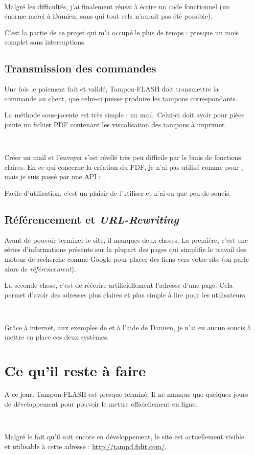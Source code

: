 ~

Malgré les difficultés, j'ai finalement réussi à écrire un code fonctionnel (un énorme merci à Damien, sans qui tout cela n'aurait pas été possible).

C'est la partie de ce projet qui m'a occupé le plus de temps : presque un mois complet sans interruptions.

\subsection{Transmission des commandes}
Une fois le paiement fait et validé, Tampon-FLASH doit transmettre la commande au client, que celui-ci puisse produire les tampons correspondants.

La méthode sous-jacente est très simple : un mail. Celui-ci doit avoir pour pièce jointe un fichier PDF contenant les visualisation des tampons à imprimer.

~

Créer un mail et l'envoyer s'est révélé très peu difficile par le biais de fonctions claires. En ce qui concerne la création du PDF, je n'ai pas utilisé \pdfcreator{} comme pour \solulog, mais je suis passé par une API : .

Facile d'utilisation, c'est un plaisir de l'utiliser et n'ai eu que peu de soucis.

\subsection{Référencement et \emph{URL-Rewriting}}
Avant de pouvoir terminer le site, il manques deux choses. La première, c'est une séries d'informations présente sur la plupart des pages qui simplifie le travail des moteur de recherche comme Google pour placer des liens vers votre site (on parle alors de \emph{référencement}).

La seconde chose, c'est de réécrire artificiellement l'adresse d'une page. Cela permet d'avoir des adresses plus claires et plus simple à lire pour les utilisateurs.

~

Grâce à internet, aux exemples de \fidit{} et à l'aide de Damien, je n'ai eu aucun soucis à mettre en place ces deux systèmes.

\section{Ce qu'il reste à faire}
A ce jour, Tampon-FLASH est presque terminé. Il ne manque que quelques jours de développement pour pouvoir le mettre officiellement en ligne.

~

Malgré le fait qu'il soit encore en développement, le site est actuellement visible et utilisable à cette adresse : \url{http://tampd.fidit.com/}.

